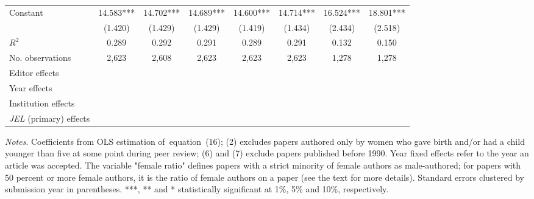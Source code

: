 \begin{table}
\begin{adjustwidth}{-0.085cm}{}
\begin{threeparttable}
\begin{tabular}{p{2.64cm}SSSSSSS}
            Constant                      &      14.583***&      14.702***&      14.689***&      14.600***&      14.714***&      16.524***&      18.801***\\
                                          &     (1.420)   &     (1.429)   &     (1.429)   &     (1.419)   &     (1.434)   &     (2.434)   &     (2.518)   \\
            \midrule
            \(R^2\)                       &       0.289   &       0.292   &       0.291   &       0.289   &       0.291   &       0.132   &       0.150   \\
            No. observations              &       2,623   &       2,608   &       2,623   &       2,623   &       2,623   &       1,278   &       1,278   \\
            \midrule
            Editor effects       &           {}   &           {}   &           {}   &           {}   &           {}   &           {}   &           {}   \\
            Year effects                  &           {}   &           {}   &           {}   &           {}   &           {}   &           {}   &           {}   \\
            Institution effects           &           {}   &           {}   &           {}   &           {}   &           {}   &           {}   &           {}   \\
            \textit{JEL} (primary) effects&               &               &               &               &               &               &           {}   \\
            \bottomrule
        \end{tabular}
        \begin{tablenotes}
            \tiny
            \item \textit{Notes}. Coefficients from OLS estimation of~equation~(16); (2) excludes papers authored only by women who gave birth and/or had a child younger than five at some point during peer review; (6) and (7) exclude papers published before 1990. Year fixed effects refer to the year an article was accepted. The variable "female ratio" defines papers with a strict minority of female authors as male-authored; for papers with 50 percent or more female authors, it is the ratio of female authors on a paper (see the text for more details). Standard errors clustered by submission year in parentheses. ***, ** and * statistically significant at 1\%, 5\% and 10\%, respectively.
        \end{tablenotes}
    \end{threeparttable}
    \end{adjustwidth}
\end{table}